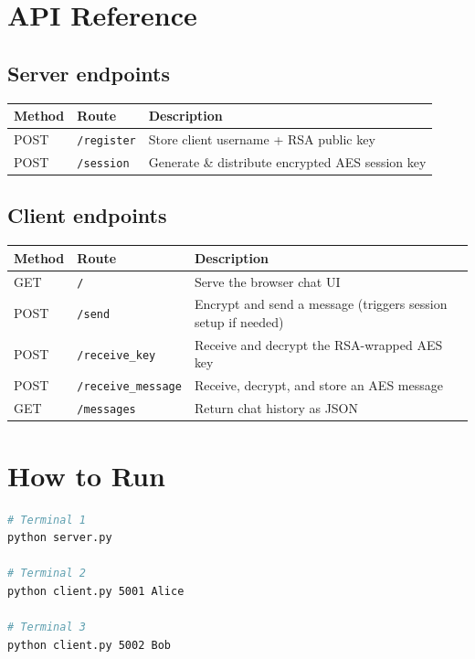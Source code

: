 \documentclass[12pt,a4paper]{article}
\begin{document}
\section{API Reference}

\subsection{Server endpoints}

\begin{tabular}{lll}
\toprule
Method & Route & Description \\
\midrule
POST & \texttt{/register} & Store client username + RSA public key \\
POST & \texttt{/session}  & Generate \& distribute encrypted AES session key \\
\bottomrule
\end{tabular}

\subsection{Client endpoints}

\begin{tabular}{lll}
\toprule
Method & Route & Description \\
\midrule
GET  & \texttt{/}                 & Serve the browser chat UI \\
POST & \texttt{/send}             & Encrypt and send a message (triggers session setup if needed) \\
POST & \texttt{/receive\_key}     & Receive and decrypt the RSA-wrapped AES key \\
POST & \texttt{/receive\_message} & Receive, decrypt, and store an AES message \\
GET  & \texttt{/messages}         & Return chat history as JSON \\
\bottomrule
\end{tabular}

\section{How to Run}

\begin{lstlisting}[language=bash]
# Terminal 1
python server.py

# Terminal 2
python client.py 5001 Alice

# Terminal 3
python client.py 5002 Bob
\end{lstlisting}
\end{document}
